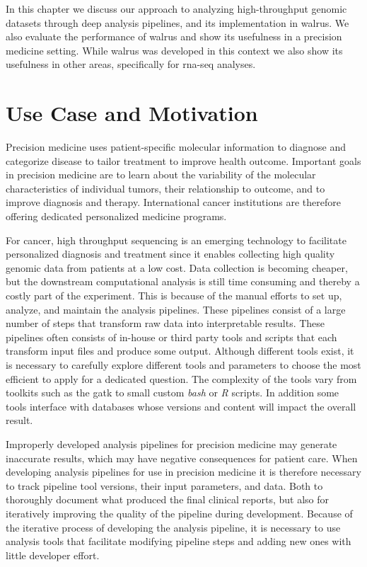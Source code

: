 In this chapter we discuss our approach to analyzing high-throughput genomic
datasets through deep analysis pipelines, and its implementation in 
walrus.\cite{walrus} We also evaluate the performance of walrus and show its
usefulness in a precision medicine setting. While walrus was developed in this
context we also show its usefulness in other areas, specifically for
\gls{rna}-seq analyses. 

\section{Use Case and Motivation} 
Precision medicine uses patient-specific molecular information to diagnose and
categorize disease to tailor treatment to improve health
outcome.\cite{national2011toward} Important goals in precision medicine are to
learn about the variability of the molecular characteristics of individual
tumors, their relationship to outcome, and to improve diagnosis and
therapy.\cite{tannock2016limits} International cancer institutions are therefore
offering dedicated personalized medicine programs. 

For cancer, high throughput sequencing is an emerging technology to facilitate
personalized diagnosis and treatment since it enables collecting high quality
genomic data from patients at a low cost. Data collection is becoming cheaper,
but the downstream computational analysis is still time consuming and thereby a
costly part of the experiment.  This is because of the manual efforts to set up,
analyze, and maintain the analysis pipelines. These pipelines consist of a large
number of steps that transform raw data into interpretable
results.\cite{diao2015building} These pipelines often consists of in-house or
third party tools and scripts that each transform input files and produce some
output. Although different tools exist, it is necessary to carefully explore
different tools and parameters to choose the most efficient to apply for a
dedicated question.\cite{servant2014bioinformatics} The complexity of the tools
vary from toolkits such as the \gls{gatk} to small custom \emph{bash} or
\emph{R} scripts.  In addition some tools interface with databases whose
versions and content will impact the overall result.\cite{sboner2015primer}

Improperly developed analysis pipelines for precision medicine may generate
inaccurate results, which may have negative consequences for patient
care.\cite{roy2017standards} 
When developing analysis pipelines for use in precision medicine it is therefore
necessary to track pipeline tool versions, their input parameters, and data.
Both to thoroughly document what produced the final clinical reports, but also
for iteratively improving the quality of the pipeline during development.
Because of the iterative process of developing the analysis pipeline, it is
necessary to use analysis tools that facilitate modifying pipeline steps and
adding new ones with little developer effort.

